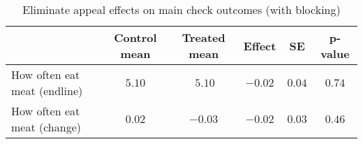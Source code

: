\begin{table*}[ht]
\caption{Eliminate appeal effects on main check outcomes (with blocking)\label{round}} 
\begin{center}
\begin{tabular}{lccccc}
\hline\hline
\multicolumn{1}{l}{}&\multicolumn{1}{c}{Control mean}&\multicolumn{1}{c}{Treated mean}&\multicolumn{1}{c}{Effect}&\multicolumn{1}{c}{SE}&\multicolumn{1}{c}{p-value}\tabularnewline
\hline
How often eat meat (endline)&$5.10$&$~5.10$&$-0.02$&$0.04$&$0.74$\tabularnewline
How often eat meat (change)&$0.02$&$-0.03$&$-0.02$&$0.03$&$0.46$\tabularnewline
\hline
\end{tabular}\end{center}

\end{table*}
